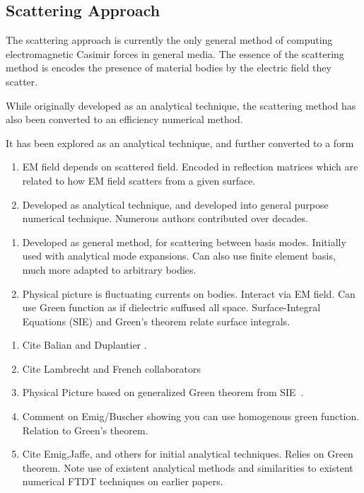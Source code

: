 \subsection{Scattering Approach}

The scattering approach is currently the only general method of computing 
electromagnetic Casimir forces in general media.  The essence of the scattering method 
is encodes the presence of material bodies by the electric field they scatter.  

While originally developed as an analytical
technique, the scattering method has also been converted to an efficiency numerical method.  

It has been explored as an analytical technique,
and further converted to a form 
\begin{enumerate}
\item EM field depends on scattered field.  Encoded in reflection matrices
which are related to how EM field scatters from a given surface.  
\item Developed as analytical technique, and developed into general purpose numerical technique.
Numerous authors contributed over decades.
\end{enumerate}

\begin{enumerate}
  \item Developed as general method, for scattering between basis modes.  
    Initially used with analytical mode expansions.  Can also use finite element basis,
    much more adapted to arbitrary bodies.  
\item Physical picture is fluctuating currents on bodies.  Interact via EM field.
  Can use Green function as if dielectric suffused all space.  
Surface-Integral Equations (SIE) and Green's theorem relate surface integrals.  
\end{enumerate}

\begin{enumerate}
\item Cite Balian and Duplantier \cite{Balian1977, Balian1978}.
\item Cite Lambrecht and French collaborators
  \cite{Lambrecht2006, MaiaNeto2008,Canaguier-Durand2012}
\item Physical Picture based on generalized Green theorem from 
  SIE~\cite{Stratton1941}.
\item Comment on Emig/Buscher showing you can use homogenous green function.
  Relation to Green's theorem.
\item Cite Emig,Jaffe,  and others for initial analytical techniques.  Relies on Green theorem.
\cite{Emig2004, Emig2007, Rahi2009}
\cite{Kenneth2006}
  Note use of existent analytical methods and similarities to existent 
  numerical FTDT techniques on earlier papers.  
  \cite{Rodriguez2007,Rodriguez2007a, Rodriguez2009}
\end{enumerate}

